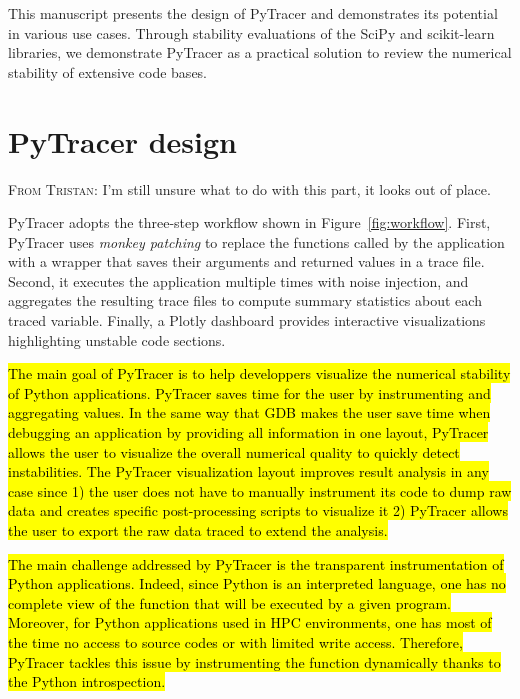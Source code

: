 \documentclass[10pt,journal,compsoc]{IEEEtran}
\newcommand{\pytracer}[0]{PyTracer\xspace}
\newcommand{\TG}[1]{\color{red}\textsc{From Tristan}: #1\xspace\color{black}}
\DeclareRobustCommand{\add}[1]{\sethlcolor{lightgreen}\hl{#1}}
\begin{document}
This manuscript presents the design of \pytracer and demonstrates its potential
in various use cases. Through stability evaluations of the SciPy and
scikit-learn libraries, we demonstrate \pytracer as a practical solution to
review the numerical stability of extensive code bases. 

\section{\pytracer design}

\TG{I'm still unsure what to do with this part, it looks out of place.}

\pytracer adopts the three-step workflow shown in Figure~\ref{fig:workflow}.
First, \pytracer uses \textit{monkey patching} to replace the functions called
by the application with a wrapper that saves their arguments and returned values
in a trace file.
Second, it executes the application multiple times with noise injection, and
aggregates the resulting trace files to compute summary statistics about each
traced variable. Finally, a Plotly dashboard provides interactive visualizations
highlighting unstable code sections.


\add{
    The main goal of PyTracer is to help developpers visualize the numerical
    stability of Python applications. PyTracer saves time for the user by
    instrumenting and aggregating values. In the same way that GDB makes the user
    save time when debugging an application by providing all information in one
    layout, PyTracer allows the user to visualize the overall numerical quality to
    quickly detect instabilities. The PyTracer visualization layout improves result
    analysis in any case since 1) the user does not have to manually instrument its
    code to dump raw data and creates specific post-processing scripts to visualize
    it 2) PyTracer allows the user to export the raw data traced to extend the
    analysis. 
}

\add{
    The main challenge addressed by PyTracer is the transparent instrumentation of Python 
    applications. Indeed, since Python is an interpreted language, one has no complete 
    view of the function that will be executed by a given program. 
    Moreover, for Python applications used in HPC environments, one has
    most of the time no access to source codes or with limited write access.
    Therefore, PyTracer tackles this issue by instrumenting the function dynamically 
    thanks to the Python introspection.
}
\end{document}
